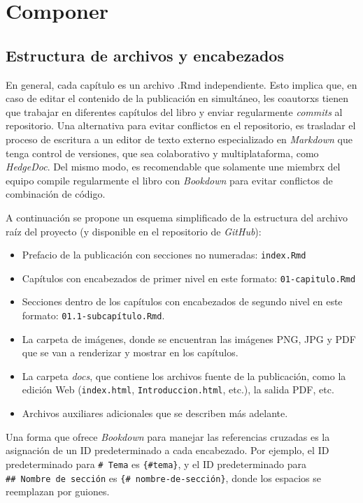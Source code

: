 \documentclass[
]{book}
\begin{document}
\hypertarget{componer}{%
\chapter{Componer}\label{componer}}

\hypertarget{estructura-de-archivos-y-encabezados}{%
\section{Estructura de archivos y encabezados}\label{estructura-de-archivos-y-encabezados}}

En general, cada capítulo es un archivo .Rmd independiente. Esto implica que, en caso de editar el contenido de la publicación en simultáneo, les coautorxs tienen que trabajar en diferentes capítulos del libro y enviar regularmente \emph{commits} al repositorio. Una alternativa para evitar conflictos en el repositorio, es trasladar el proceso de escritura a un editor de texto externo especializado en \emph{Markdown} que tenga control de versiones, que sea colaborativo y multiplataforma, como \emph{HedgeDoc}. Del mismo modo, es recomendable que solamente une miembrx del equipo compile regularmente el libro con \emph{Bookdown} para evitar conflictos de combinación de código.

A continuación se propone un esquema simplificado de la estructura del archivo raíz del proyecto (y disponible en el repositorio de \emph{GitHub}):

\begin{itemize}
\item
  Prefacio de la publicación con secciones no numeradas: \texttt{index.Rmd}
\item
  Capítulos con encabezados de primer nivel en este formato: \texttt{01-capitulo.Rmd}
\item
  Secciones dentro de los capítulos con encabezados de segundo nivel en este formato: \texttt{01.1-subcapítulo.Rmd}.
\item
  La carpeta de imágenes, donde se encuentran las imágenes PNG, JPG y PDF que se van a renderizar y mostrar en los capítulos.
\item
  La carpeta \emph{docs}, que contiene los archivos fuente de la publicación, como la edición Web (\texttt{index.html}, \texttt{Introduccion.html}, etc.), la salida PDF, etc.
\item
  Archivos auxiliares adicionales que se describen más adelante.
\end{itemize}

Una forma que ofrece \emph{Bookdown} para manejar las referencias cruzadas es la asignación de un ID predeterminado a cada encabezado. Por ejemplo, el ID predeterminado para \texttt{\#\ Tema} es \texttt{\{\#tema\}}, y el ID predeterminado para \texttt{\#\#\ Nombre\ de\ sección} es \texttt{\{\#\ nombre-de-sección\}}, donde los espacios se reemplazan por guiones.
\end{document}
